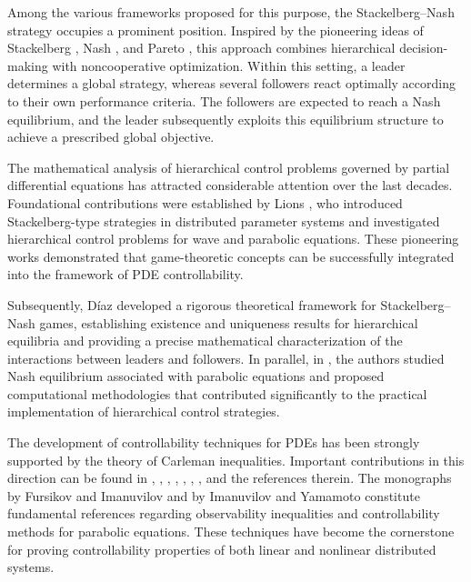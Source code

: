 \documentclass[11pt,a4paper]{amsart}
\numberwithin{equation}{section}
\begin{document}
Among the various frameworks proposed for this purpose, the Stackelberg–Nash strategy occupies a prominent position. Inspired by the pioneering ideas of Stackelberg \cite{Stack}, Nash \cite{Nash}, and Pareto \cite{Pareto}, this approach combines hierarchical decision-making with noncooperative optimization. Within this setting, a leader determines a global strategy, whereas several followers react optimally according to their own performance criteria. The followers are expected to reach a Nash equilibrium, and the leader subsequently exploits this equilibrium structure to achieve a prescribed global objective.

The mathematical analysis of hierarchical control problems governed by partial differential equations has attracted considerable attention over the last decades. Foundational contributions were established by Lions \cite{Lions, Lions-Stack}, who introduced Stackelberg-type strategies in distributed parameter systems and investigated hierarchical control problems for wave and parabolic equations. These pioneering works demonstrated that game-theoretic concepts can be successfully integrated into the framework of PDE controllability.

Subsequently, Díaz \cite{Diaz2002} developed a rigorous theoretical framework for Stackelberg–Nash games, establishing existence and uniqueness results for hierarchical equilibria and providing a precise mathematical characterization of the interactions between leaders and followers. In parallel, in \cite{Glowinski}, the authors studied Nash equilibrium associated with parabolic equations and proposed computational methodologies that contributed significantly to the practical implementation of hierarchical control strategies.

The development of controllability techniques for PDEs has been strongly supported by the theory of Carleman inequalities. Important contributions in this direction can be found in \cite{Cannarsa-2016}, \cite{Li-Clark-EFCara}, \cite{Fa-Zuazua}, \cite{EFC-Li2003}, \cite{EFC-Teresa-10}, \cite{Cara-Limaco-21}, \cite{EFC-Nina-Nu-Vi}, \cite{LiuZhang} and the references therein. %
The monographs by Fursikov and Imanuvilov \cite{FurImanu} and by Imanuvilov and Yamamoto \cite{Imanu-Yama} constitute fundamental references regarding observability inequalities and controllability methods for parabolic equations. These techniques have become the cornerstone for proving controllability properties of both linear and nonlinear distributed systems.
\end{document}
